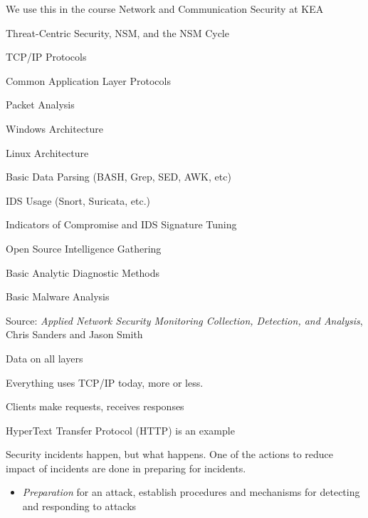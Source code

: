 \documentclass[Screen16to9,17pt]{foils}
\begin{document}
We use this in the course Network and Communication Security at KEA


\begin{list2}\small
\item Threat-Centric Security, NSM, and the NSM Cycle
\item TCP/IP Protocols
\item Common Application Layer Protocols
\item Packet Analysis
\item Windows Architecture
\item Linux Architecture
\item Basic Data Parsing (BASH, Grep, SED, AWK, etc)
\item IDS Usage (Snort, Suricata, etc.)
\item Indicators of Compromise and IDS Signature Tuning
\item Open Source Intelligence Gathering
\item Basic Analytic Diagnostic Methods
\item Basic Malware Analysis
\end{list2}

Source: \emph{Applied Network Security Monitoring Collection, Detection, and Analysis}, Chris Sanders and Jason Smith




\centerline{Data on all layers}



\begin{list2}
\item Everything uses TCP/IP today, more or less.
\item Clients make requests, receives responses
\item HyperText Transfer Protocol (HTTP) is an example
\end{list2}



Security incidents happen, but what happens. One of the actions to reduce impact of incidents are done in preparing for incidents.

\begin{itemize}
\item \emph{Preparation} for an attack, establish procedures and mechanisms for detecting and responding to attacks
\end{itemize}
\end{document}

